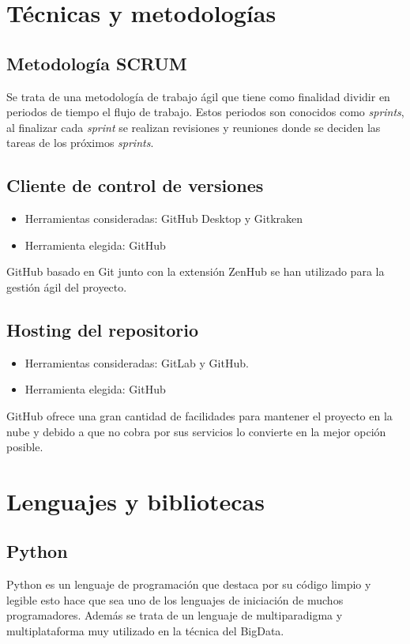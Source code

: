 
\section{Técnicas y metodologías}

\subsection{Metodología SCRUM}
Se trata de una metodología de trabajo ágil que tiene como finalidad dividir en periodos de tiempo el flujo de trabajo. Estos periodos son conocidos como  \textit{sprints}, al finalizar cada \textit{sprint} se realizan revisiones y reuniones donde se deciden las tareas de los próximos \textit{sprints}.

\subsection{Cliente de control de versiones}
\begin{itemize}
\item Herramientas consideradas: GitHub Desktop y Gitkraken
\item Herramienta elegida: GitHub
\end{itemize}

GitHub basado en Git junto con la extensión ZenHub se han utilizado para la gestión ágil del proyecto.

\subsection{Hosting del repositorio}
\begin{itemize}
\item Herramientas consideradas: GitLab y GitHub.
\item Herramienta elegida: GitHub
\end{itemize}

GitHub ofrece una gran cantidad de facilidades para mantener el proyecto en la nube y debido a que no cobra por sus servicios lo convierte en la mejor opción posible.


\section{Lenguajes y bibliotecas}

\subsection{Python}
Python es un lenguaje de programación que destaca por su código limpio y legible esto hace que sea uno de los lenguajes de iniciación de muchos programadores.
Además se trata de un lenguaje de multiparadigma y multiplataforma muy utilizado en la técnica del BigData.

